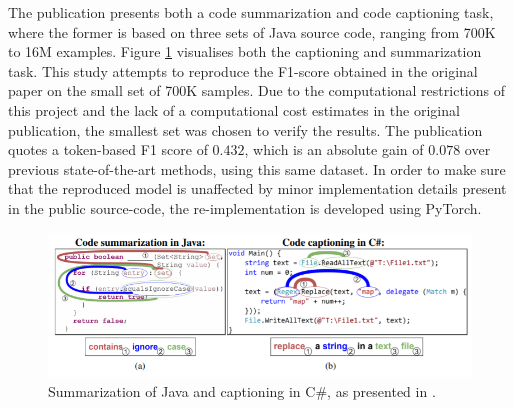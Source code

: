 \documentclass{article} %
\begin{document}
The publication presents both a code summarization and code captioning task, where the former is based on three sets of Java source code, ranging from 700K to 16M examples. Figure \ref{fig:code-sum-vis} visualises both the captioning and summarization task. This study attempts to reproduce the F1-score obtained in the original paper on the small set of 700K samples. Due to the computational restrictions of this project and the lack of a computational cost estimates in the original publication, the smallest set was chosen to verify the results. The publication quotes a token-based F1 score of $0.432$, which is an absolute gain of $0.078$ over previous state-of-the-art methods, using this same dataset. In order to make sure that the reproduced model is unaffected by minor implementation details present in the public source-code, the re-implementation is developed using PyTorch.

\begin{figure}[hbt!]
	\centering
	\includegraphics[width=.9\textwidth]{imgs/code_sum_cap_vis.png}
    \captionsetup{justification=centering}
	\caption{Summarization of Java and captioning in C\#, as presented in \cite{alon2019}.}
	\label{fig:code-sum-vis}
\end{figure}

\end{document}
